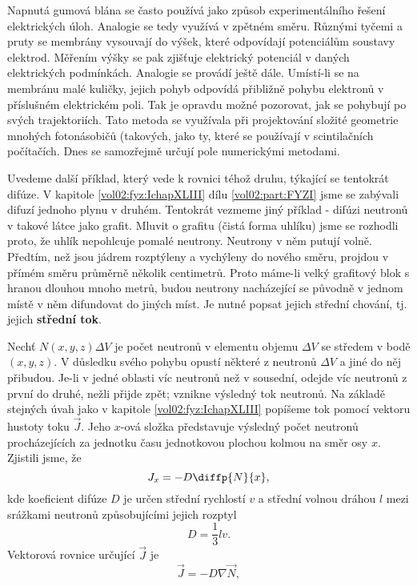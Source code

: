     Napnutá gumová blána se často používá jako způsob experimentálního řešení elektrických úloh.
    Analogie se tedy využívá v zpětném směru. Různými tyčemi a pruty se membrány vysouvají do výšek,
    které odpovídají potenciálům soustavy elektrod. Měřením výšky se pak zjišťuje elektrický
    potenciál v daných elektrických podmínkách. Analogie se provádí ještě dále. Umístí-li se na
    membránu malé kuličky, jejich pohyb odpovídá přibližně pohybu elektronů v příslušném elektrickém
    poli. Tak je opravdu možné pozorovat, jak se  pohybují po svých trajektoriích.
    Tato metoda se využívala při projektování složité geometrie mnohých fotonásobičů (takových, jako
    ty, které se používají v scintilačních počítačích. Dnes se samozřejmě určují pole numerickými
    metodami.

  
    Uvedeme další příklad, který vede k rovnici téhož druhu, týkající se tentokrát difúze. V
    kapitole \ref{vol02:fyz:IchapXLIII} dílu \ref{vol02:part:FYZI} jsme se zabývali difuzí jednoho plynu v
    druhém. Tentokrát vezmeme jiný příklad - difúzi neutronů v takové látce jako grafit. Mluvit o
    grafitu (čistá forma uhlíku) jsme se rozhodli proto, že uhlík nepohlcuje pomalé neutrony.
    Neutrony v něm putují volně. Předtím, než jsou jádrem rozptýleny a vychýleny do nového směru,
    projdou v přímém směru průměrně několik centimetrů. Proto máme-li velký grafitový blok s hranou
    dlouhou mnoho metrů, budou neutrony nacházející se původně v jednom místě v něm difundovat do
    jiných míst. Je nutné popsat jejich střední chování, tj. jejich \textbf{střední tok}.

    Nechť \(N(x, y, z)\Delta V\) je počet neutronů v elementu objemu \(\Delta V\) se středem v bodě
    \((x, y, z)\). V důsledku svého pohybu opustí některé z neutronů \(\Delta V\) a jiné do něj
    přibudou. Je-li v jedné oblasti víc neutronů než v sousední, odejde víc neutronů z první do
    druhé, nežli přijde zpět; vznikne výsledný tok neutronů. Na základě stejných úvah jako v
    kapitole \ref{vol02:fyz:IchapXLIII} popíšeme tok pomocí vektoru hustoty toku \(\vec{J}\). Jeho
    \(x\)-ová složka představuje výsledný počet neutronů procházejících za jednotku času
    jednotkovou plochou kolmou na směr osy \(x\). Zjistili jsme, že
    \begin{equation*}
      J_x = -D\diffp{N}{x},
    \end{equation*} 
    kde koeficient difúze \(D\) je určen střední rychlostí \(v\) a střední volnou dráhou \(l\) mezi
    srážkami neutronů způsobujícími jejich rozptyl
    \begin{equation*}
      D = \frac{1}{3}lv.
    \end{equation*}
    Vektorová rovnice určující \(\vec{J}\) je
    \begin{equation}\label{fyz:eq775}
      \vec{J} = -D\nabla\vec{N},
    \end{equation} 

